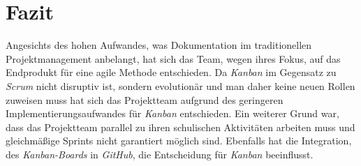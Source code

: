 \section{Fazit}
Angesichts des hohen Aufwandes, was Dokumentation im traditionellen Projektmanagement anbelangt, hat sich das Team, wegen ihres Fokus, auf das Endprodukt für eine agile Methode entschieden. Da \textit{Kanban} im Gegensatz zu \textit{Scrum} nicht disruptiv ist, sondern evolutionär und man daher keine neuen Rollen zuweisen muss hat sich das Projektteam aufgrund des geringeren Implementierungsaufwandes für \textit{Kanban} entschieden. Ein weiterer Grund war, dass das Projektteam parallel zu ihren schulischen Aktivitäten arbeiten muss und gleichmäßige Sprints nicht garantiert möglich sind. Ebenfalls hat die Integration, des \textit{Kanban-Boards} in \textit{GitHub}, die Entscheidung für \textit{Kanban} beeinflusst.